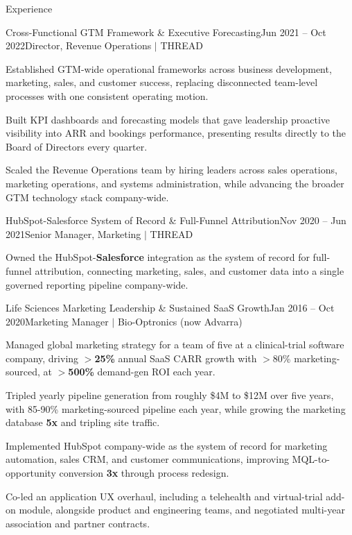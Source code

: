 \documentclass{resume}
\begin{document}
\begin{rSection}{Experience}
\begin{rSubsection}{Cross-Functional GTM Framework \& Executive Forecasting}{\textcolor{black!60}{Jun 2021 -- Oct 2022}}{Director, Revenue Operations $\vert$ THREAD}{}
\item Established GTM-wide operational frameworks across business development, marketing, sales, and customer success, replacing disconnected team-level processes with one consistent operating motion.
\item Built KPI dashboards and forecasting models that gave leadership proactive visibility into ARR and bookings performance, presenting results directly to the Board of Directors every quarter.
\item Scaled the Revenue Operations team by hiring leaders across sales operations, marketing operations, and systems administration, while advancing the broader GTM technology stack company-wide.
\end{rSubsection}

\begin{rSubsection}{HubSpot-Salesforce System of Record \& Full-Funnel Attribution}{\textcolor{black!60}{Nov 2020 -- Jun 2021}}{Senior Manager, Marketing $\vert$ THREAD}{}
\item Owned the HubSpot-\textbf{Salesforce} integration as the system of record for full-funnel attribution, connecting marketing, sales, and customer data into a single governed reporting pipeline company-wide.
\end{rSubsection}

\begin{rSubsection}{Life Sciences Marketing Leadership \& Sustained SaaS Growth}{\textcolor{black!60}{Jan 2016 -- Oct 2020}}{Marketing Manager $\vert$ Bio-Optronics (now Advarra)}{}
\item Managed global marketing strategy for a team of five at a clinical-trial software company, driving $>$\textbf{25\%} annual SaaS CARR growth with $>$80\% marketing-sourced, at $>$\textbf{500\%} demand-gen ROI each year.
\item Tripled yearly pipeline generation from roughly \$4M to \$12M over five years, with 85-90\% marketing-sourced pipeline each year, while growing the marketing database \textbf{5x} and tripling site traffic.
\item Implemented HubSpot company-wide as the system of record for marketing automation, sales CRM, and customer communications, improving MQL-to-opportunity conversion \textbf{3x} through process redesign.
\item Co-led an application UX overhaul, including a telehealth and virtual-trial add-on module, alongside product and engineering teams, and negotiated multi-year association and partner contracts.
\end{rSubsection}


\end{rSection}
\end{document}
